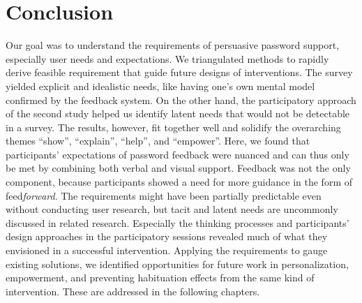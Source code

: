 \section{Conclusion}
Our goal was to understand the requirements of persuasive password support, especially user needs and expectations. 
We triangulated methods to rapidly derive feasible requirement that guide future designs of interventions. 
The survey yielded explicit and idealistic needs, like having one's own mental model confirmed by the feedback system. On the other hand, the participatory approach of the second study helped us identify latent needs that would not be detectable in a survey. The results, however, fit together well and solidify the overarching themes ``show'', ``explain'', ``help'', and ``empower''. 
Here, we found that participants' expectations of password feedback were nuanced and can thus only be met by combining both verbal and visual support. Feedback was not the only component, because participants showed a need for more guidance in the form of feed\textit{forward}.
The requirements might have been partially predictable even without conducting user research, but tacit and latent needs are uncommonly discussed in related research. Especially the thinking processes and participants' design approaches in the participatory sessions revealed much of what they envisioned in a successful intervention.
Applying the requirements to gauge existing solutions, we identified opportunities for future work in personalization, empowerment, and preventing habituation effects from the same kind of intervention. These are addressed in the following chapters. 


